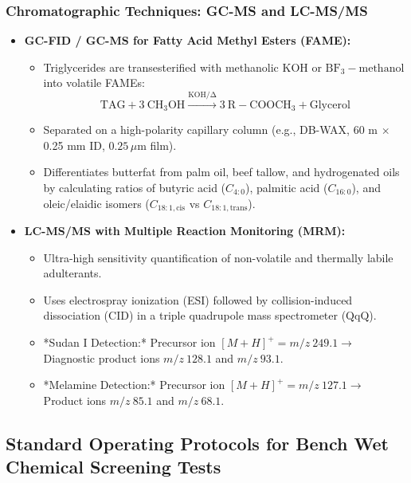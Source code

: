 \documentclass[11pt,a4paper,oneside]{article}
\begin{document}
\subsubsection{Chromatographic Techniques: GC-MS and LC-MS/MS}
\begin{itemize}[leftmargin=*]
    \item \textbf{GC-FID / GC-MS for Fatty Acid Methyl Esters (FAME):}
    \begin{itemize}
        \item Triglycerides are transesterified with methanolic $\mathrm{KOH}$ or $\mathrm{BF_3-methanol}$ into volatile FAMEs:
        $$\mathrm{TAG + 3\ CH_3OH \xrightarrow{KOH / \Delta} 3\ R-COOCH_3 + Glycerol}$$
        \item Separated on a high-polarity capillary column (e.g., DB-WAX, 60 m $\times$ 0.25 mm ID, $0.25\,\mu\text{m}$ film).
        \item Differentiates butterfat from palm oil, beef tallow, and hydrogenated oils by calculating ratios of butyric acid ($C_{4:0}$), palmitic acid ($C_{16:0}$), and oleic/elaidic isomers ($C_{18:1,\text{cis}}$ vs $C_{18:1,\text{trans}}$).
    \end{itemize}
    \item \textbf{LC-MS/MS with Multiple Reaction Monitoring (MRM):}
    \begin{itemize}
        \item Ultra-high sensitivity quantification of non-volatile and thermally labile adulterants.
        \item Uses electrospray ionization (ESI) followed by collision-induced dissociation (CID) in a triple quadrupole mass spectrometer ($\mathrm{QqQ}$).
        \item *Sudan I Detection:* Precursor ion $[M+H]^+ = m/z\ 249.1 \to$ Diagnostic product ions $m/z\ 128.1$ and $m/z\ 93.1$.
        \item *Melamine Detection:* Precursor ion $[M+H]^+ = m/z\ 127.1 \to$ Product ions $m/z\ 85.1$ and $m/z\ 68.1$.
    \end{itemize}
\end{itemize}

\subsection{Standard Operating Protocols for Bench Wet Chemical Screening Tests}
\end{document}
